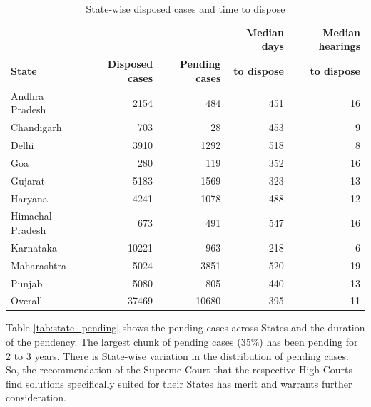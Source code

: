 \documentclass[12pt,a4paper]{article}
\begin{document}
\begin{table}[!ht]
\caption{State-wise disposed cases and time to dispose}\label{tab:state_disposal}
\centering
\footnotesize
\begin{tabular}{lrrrr}
\toprule
& & & \textbf{Median days} & \textbf{Median hearings} \\
\textbf{State} & \textbf{Disposed cases} & \textbf{Pending cases} & \textbf{to dispose} & \textbf{to dispose} \\
\midrule
Andhra Pradesh & 2154 & 484 & 451 & 16 \\
Chandigarh & 703 & 28 & 453 & 9 \\
Delhi & 3910 & 1292 & 518 & 8 \\
Goa & 280 & 119 & 352 & 16 \\
Gujarat & 5183 & 1569 & 323 & 13 \\
Haryana & 4241 & 1078 & 488 & 12 \\
Himachal Pradesh & 673 & 491 & 547 & 16 \\
Karnataka & 10221 & 963 & 218 & 6 \\
Maharashtra & 5024 & 3851 & 520 & 19 \\
Punjab & 5080 & 805 & 440 & 13 \\
\midrule
Overall & 37469 & 10680 & 395 & 11 \\
\bottomrule
\end{tabular}
\end{table}

Table \ref{tab:state_pending} shows the pending cases across States and the duration of the pendency. The largest chunk of pending cases (35\%) has been pending for 2 to 3 years. There is State-wise variation in the distribution of pending cases. So, the recommendation of the Supreme Court that the respective High Courts find solutions specifically suited for their States has merit and warrants further consideration.
\end{document}
